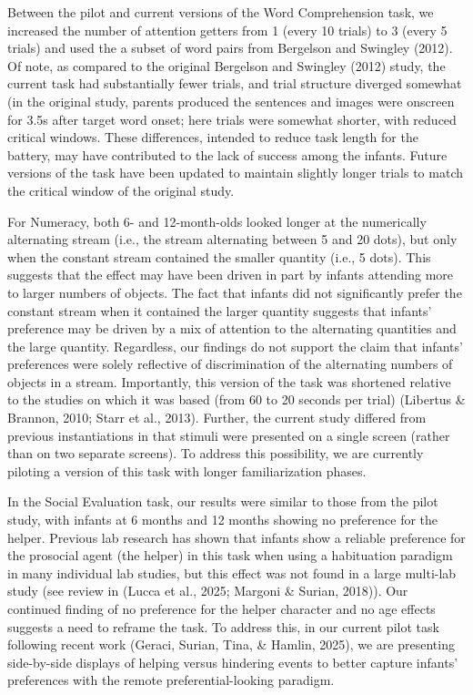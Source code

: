 \documentclass[
  english,
  man,floatsintext]{apa6}
\begin{document}
Between the pilot and current versions of the Word Comprehension task, we increased the number of attention getters from 1 (every 10 trials) to 3 (every 5 trials) and used the a subset of word pairs from Bergelson and Swingley (2012).
Of note, as compared to the original Bergelson and Swingley (2012) study, the current task had substantially fewer trials, and trial structure diverged somewhat (in the original study, parents produced the sentences and images were onscreen for 3.5s after target word onset; here trials were somewhat shorter, with reduced critical windows. These differences, intended to reduce task length for the battery, may have contributed to the lack of success among the infants. Future versions of the task have been updated to maintain slightly longer trials to match the critical window of the original study.

For Numeracy, both 6- and 12-month-olds looked longer at the numerically alternating stream (i.e., the stream alternating between 5 and 20 dots), but only when the constant stream contained the smaller quantity (i.e., 5 dots).
This suggests that the effect may have been driven in part by infants attending more to larger numbers of objects.
The fact that infants did not significantly prefer the constant stream when it contained the larger quantity suggests that infants' preference may be driven by a mix of attention to the alternating quantities and the large quantity.
Regardless, our findings do not support the claim that infants' preferences were solely reflective of discrimination of the alternating numbers of objects in a stream.
Importantly, this version of the task was shortened relative to the studies on which it was based (from 60 to 20 seconds per trial) (Libertus \& Brannon, 2010; Starr et al., 2013).
Further, the current study differed from previous instantiations in that stimuli were presented on a single screen (rather than on two separate screens).
To address this possibility, we are currently piloting a version of this task with longer familiarization phases.

In the Social Evaluation task, our results were similar to those from the pilot study, with infants at 6 months and 12 months showing no preference for the helper.
Previous lab research has shown that infants show a reliable preference for the prosocial agent (the helper) in this task when using a habituation paradigm in many individual lab studies, but this effect was not found in a large multi-lab study (see review in (Lucca et al., 2025; Margoni \& Surian, 2018)).
Our continued finding of no preference for the helper character and no age effects suggests a need to reframe the task.
To address this, in our current pilot task following recent work (Geraci, Surian, Tina, \& Hamlin, 2025), we are presenting side-by-side displays of helping versus hindering events to better capture infants' preferences with the remote preferential-looking paradigm.
\\
\end{document}
